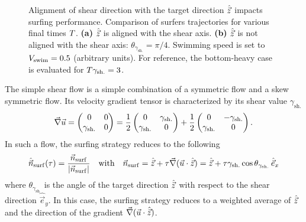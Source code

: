 \begin{figure}%
	\centering
	
	\caption[Alignment of shear direction with the target direction $\Direction$ impacts surfing performance.]{
		Alignment of shear direction with the target direction $\Direction$ impacts surfing performance.
		Comparison of surfers trajectories for various final times $T$.
		\textbf{(a)} $\Direction$ is aligned with the shear axis.
		\textbf{(b)} $\Direction$ is not aligned with the shear axis: $\theta_{\gamma_{\mathrm{sh.}}} = \pi/4$. 
		Swimming speed is set to $V_{\mathrm{swim}} = 0.5$ (arbitrary units).
		For reference, the bottom-heavy case is evaluated for $T \gamma_{\mathrm{sh.}} = 3$. 
	}
	\label{fig:simple_shear_surf}
\end{figure}
The simple shear flow is a simple combination of a symmetric flow and a skew symmetric flow. 
Its velocity gradient tensor is characterized by its shear value $\gamma_{\mathrm{sh.}}$
\begin{equation}\label{eq:taylor_green_vortex_velocity}
	\vec{\nabla} \vec{u} =
	\begin{pmatrix}
		0 & 0 \\
		\gamma_{\mathrm{sh.}} & 0
	\end{pmatrix} = \frac{1}{2}
	\begin{pmatrix}
		0 & \gamma_{\mathrm{sh.}} \\
		\gamma_{\mathrm{sh.}} & 0
	\end{pmatrix} + \frac{1}{2}
	\begin{pmatrix}
		0 & -\gamma_{\mathrm{sh.}} \\
		\gamma_{\mathrm{sh.}} & 0
	\end{pmatrix}.
\end{equation}
In such a flow, the surfing strategy reduces to the following
\begin{equation}
	\label{eq:optimal_swimming_direction_partial_asym}
	\hat{\vec{n}}_{\mathrm{surf}}(\tau) = \frac{\vec{n}_{\mathrm{surf}}}{\lvert\vec{n}_{\mathrm{surf}}\rvert} \quad \text{with} \quad \vec{n}_{\mathrm{surf}} = \hat{\vec{z}} + \tau \vec{\nabla} (\vec{u} \cdot \hat{\vec{z}}) = \hat{\vec{z}} + \tau \gamma_{\mathrm{sh.}} \cos \theta_{\gamma_{\mathrm{sh.}}} \, \hat{\vec{e}}_x
\end{equation}
where $\theta_{\gamma_{\mathrm{sh.}}}$ is the angle of the target direction $\Direction$ with respect to the shear direction $\hat{\vec{e}}_y$.
In this case, the surfing strategy reduces to a weighted average of $\Direction$ and the direction of the gradient $\vec{\nabla} (\vec{u} \cdot \hat{\vec{z}})$. 

